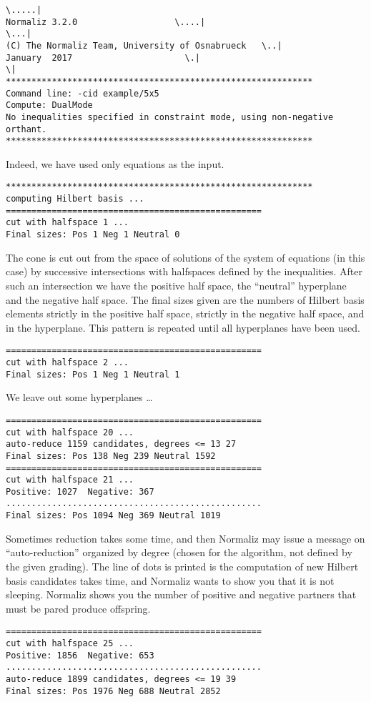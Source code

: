 \documentclass[12pt,a4paper]{scrartcl}
\theoremstyle{definition}
\begin{document}
\begin{Verbatim}
\.....|
Normaliz 3.2.0                   \....|
\...|
(C) The Normaliz Team, University of Osnabrueck   \..|
January  2017                      \.|
\|
************************************************************
Command line: -cid example/5x5 
Compute: DualMode 
No inequalities specified in constraint mode, using non-negative orthant.
************************************************************
\end{Verbatim}
Indeed, we have used only equations as the input.
\begin{Verbatim}
************************************************************
computing Hilbert basis ...
==================================================
cut with halfspace 1 ...
Final sizes: Pos 1 Neg 1 Neutral 0
\end{Verbatim}
The cone is cut out from the space of solutions of the system of equations (in this case) by successive intersections with halfspaces defined by the inequalities. After such an intersection we have the positive half space, the ``neutral'' hyperplane and the negative half space. The final sizes given are the numbers of Hilbert basis elements strictly in the positive half space, strictly in the negative half space, and in the hyperplane. This pattern is repeated until all hyperplanes have been used.
\begin{Verbatim}
==================================================
cut with halfspace 2 ...
Final sizes: Pos 1 Neg 1 Neutral 1
\end{Verbatim}
We leave out some hyperplanes \dots
\begin{Verbatim}
==================================================
cut with halfspace 20 ...
auto-reduce 1159 candidates, degrees <= 13 27 
Final sizes: Pos 138 Neg 239 Neutral 1592
==================================================
cut with halfspace 21 ...
Positive: 1027  Negative: 367
..................................................
Final sizes: Pos 1094 Neg 369 Neutral 1019
\end{Verbatim}
Sometimes reduction takes some time, and then Normaliz may issue a message on ``auto-reduction'' organized by degree (chosen for the algorithm, not defined by the given grading). The line of dots is printed is the computation of new Hilbert basis candidates takes time, and Normaliz wants to show you that it is not sleeping. Normaliz shows you the number of positive and negative partners that must be pared produce offspring.
\begin{Verbatim}
==================================================
cut with halfspace 25 ...
Positive: 1856  Negative: 653
..................................................
auto-reduce 1899 candidates, degrees <= 19 39 
Final sizes: Pos 1976 Neg 688 Neutral 2852
\end{Verbatim}
\end{document}
